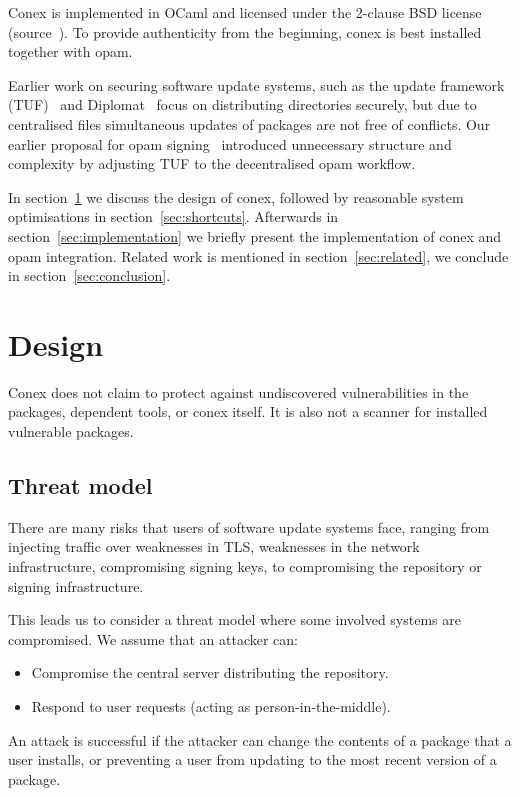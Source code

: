 \documentclass[nocopyrightspace]{sigplanconf}
\begin{document}
Conex is implemented in OCaml and licensed under the 2-clause BSD license (source~\cite{conex}).
To provide authenticity from the beginning, conex is best installed together with opam.

Earlier work on securing software update systems, such as the update framework (TUF)~\cite{tuf} and Diplomat~\cite{diplomat} focus on distributing directories securely, but due to centralised files simultaneous updates of packages are not free of conflicts.
Our earlier proposal for opam signing~\cite{opamsigning} introduced unnecessary structure and complexity by adjusting TUF to the decentralised opam workflow.

In section~\ref{sec:design} we discuss the design of conex, followed by reasonable system optimisations in section~\ref{sec:shortcuts}.
Afterwards in section~\ref{sec:implementation} we briefly present the implementation of conex and opam integration.
Related work is mentioned in section~\ref{sec:related}, we conclude in section~\ref{sec:conclusion}.

\section{Design} \label{sec:design}
Conex does not claim to protect against undiscovered vulnerabilities in the packages, dependent tools, or conex itself.
It is also not a scanner for installed vulnerable packages.

\subsection{Threat model}
There are many risks that users of software update systems face, ranging from injecting traffic over weaknesses in TLS, weaknesses in the network infrastructure, compromising signing keys, to compromising the repository or signing infrastructure.

This leads us to consider a threat model where some involved systems are compromised.  We assume that an attacker can:
\begin{itemize}
  \item Compromise the central server distributing the repository.
  \item Respond to user requests (acting as person-in-the-middle).
\end{itemize}

An attack is successful if the attacker can change the contents of a package that a user installs, or preventing a user from updating to the most recent version of a package.
\end{document}

